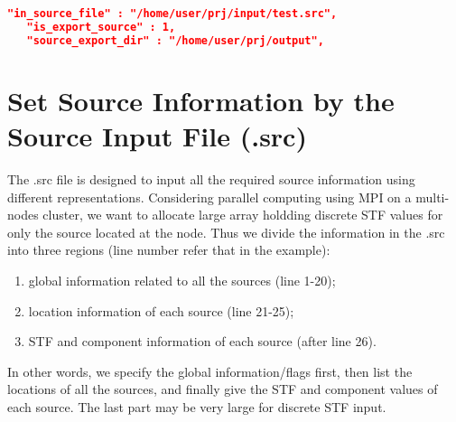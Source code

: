 \begin{lstlisting}[language=json, title=Example of source settings in .json, frame=tb]
   "in_source_file" : "/home/user/prj/input/test.src",
   "is_export_source" : 1,
   "source_export_dir" : "/home/user/prj/output",
\end{lstlisting}


\section{Set Source Information by the Source Input File (.src)} \label{src_format}

The .src file is designed to input all the required source information using different representations.
Considering parallel computing using MPI on a multi-nodes cluster, we want to allocate
large array holdding discrete STF values for only the source located at the node.
Thus we divide the information in the .src into three regions (line number refer that in the example):
\begin{enumerate}
    \item global information related to all the sources (line 1-20);
    \item location information of each source (line 21-25);
    \item STF and component information of each source (after line 26).
\end{enumerate}
In other words, we specify the global information/flags first,
 then list the locations of all the sources,
 and finally give the STF and component values of each source.
 The last part may be very large for discrete STF input.

